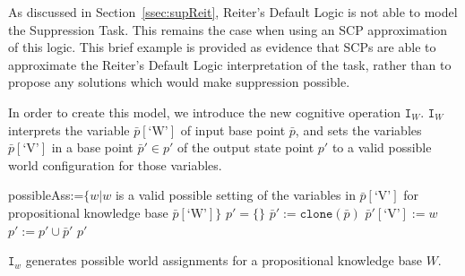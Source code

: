 As discussed in Section~\ref{ssec:supReit}, Reiter's Default Logic is not able to model the Suppression Task. This remains the case when using an SCP approximation of this logic. This brief example is provided as evidence that SCPs are able to approximate the Reiter's Default Logic interpretation of the task, rather than to propose any solutions which would make suppression possible.

In order to create this model, we introduce the new cognitive operation $\texttt{I}_W$. $\texttt{I}_W$ interprets the variable $\bar{p}[\text{`W'}]$ of input base point $\bar{p}$, and sets the variables  $\bar{p}[\text{`V'}]$ in a base point $\bar{p}'\in p'$ of the output state point $p'$ to a valid possible world configuration for those variables.


\begin{algorithm}[H]
\SetAlgoLined
{}
{
possibleAss:=$\{w|w$ is a valid possible setting of the variables in $ \bar{p}[\text{`V'}] $ for propositional knowledge base $\bar{p}[\text{`W'}]\}$\;
$p'=\{\}$\;
{
$\bar{p}':=\texttt{clone}(\bar{p})$\;
$\bar{p}'[\text{`V'}]:=w$\;
$p':=p' \cup \bar{p}'$\;
} 
\Return $p'$
}
\caption{$\texttt{I}_w$ generates possible world assignments for a propositional knowledge base $W$.}
 \label{alg:I}
\end{algorithm}


